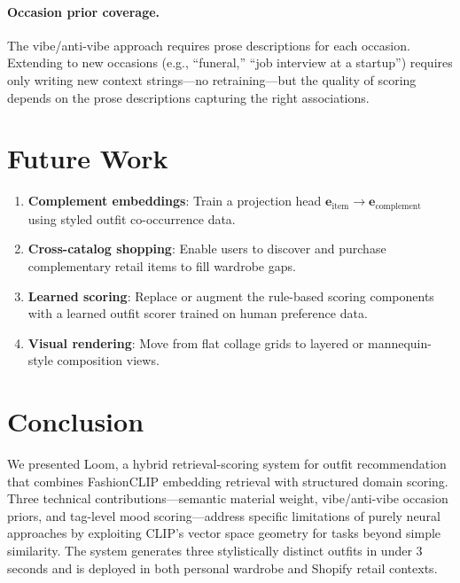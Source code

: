 \documentclass[10pt,twocolumn]{article}
\begin{document}
\paragraph{Occasion prior coverage.}
The vibe/anti-vibe approach requires prose descriptions for each occasion.
Extending to new occasions (e.g., ``funeral,'' ``job interview at a
startup'') requires only writing new context strings---no retraining---but
the quality of scoring depends on the prose descriptions capturing the right
associations.

\section{Future Work}
\label{sec:future}

\begin{enumerate}[leftmargin=*,topsep=2pt,itemsep=1pt]
\item \textbf{Complement embeddings}: Train a projection head
  $\mathbf{e}_{\text{item}} \to \mathbf{e}_{\text{complement}}$ using
  styled outfit co-occurrence data.
\item \textbf{Cross-catalog shopping}: Enable users to discover and purchase
  complementary retail items to fill wardrobe gaps.
\item \textbf{Learned scoring}: Replace or augment the rule-based scoring
  components with a learned outfit scorer trained on human preference data.
\item \textbf{Visual rendering}: Move from flat collage grids to layered
  or mannequin-style composition views.
\end{enumerate}

\section{Conclusion}

We presented Loom, a hybrid retrieval-scoring system for outfit
recommendation that combines FashionCLIP embedding retrieval with structured
domain scoring.  Three technical contributions---semantic material weight,
vibe/anti-vibe occasion priors, and tag-level mood scoring---address
specific limitations of purely neural approaches by exploiting CLIP's vector
space geometry for tasks beyond simple similarity.  The system generates
three stylistically distinct outfits in under 3 seconds and is deployed in
both personal wardrobe and Shopify retail contexts.
\end{document}
